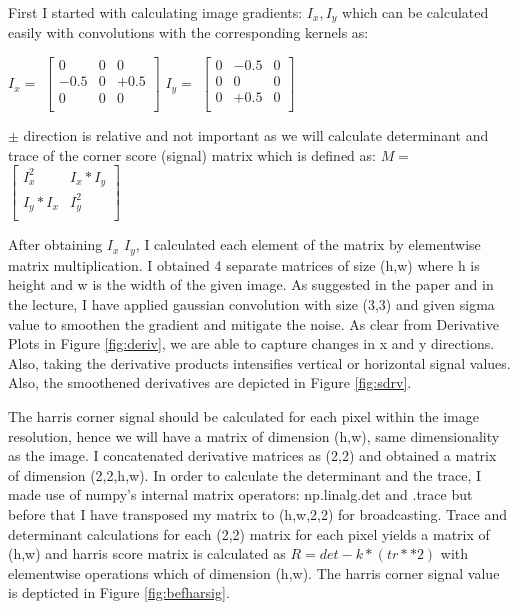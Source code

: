 \documentclass{article}
\begin{document}
\begin{center}
    \raggedright
    First I started with calculating image gradients: $I_x, I_y$ which can be calculated easily with convolutions with the corresponding kernels as: \\
    \vspace{0.5cm}

    $I_x = $ 
    $\begin{bmatrix}
        0 & 0 & 0  \\
        -0.5 & 0 & +0.5  \\
        0 & 0 & 0  \\
    \end{bmatrix}$ \quad
    $I_y = $ 
    $\begin{bmatrix}
        0 & -0.5 & 0  \\
        0 & 0 & 0  \\
        0 & +0.5 & 0  \\
    \end{bmatrix}$
    
    $\pm $ direction is relative and not important as we will calculate determinant and trace of the corner score (signal) matrix which is defined as:
    $M = $
    $\begin{bmatrix}
        I_x^{2} & I_{x}*I_{y} \\
        I_{y}*I_{x} & I_y^{2} \\
    \end{bmatrix}$

    \begin{center}
        \raggedright
        After obtaining $I_x$ $I_y$, I calculated each element of the matrix by elementwise matrix multiplication. I obtained 4 separate matrices of size (h,w) where h is height and w is the width of the given image. As suggested in the paper and in the lecture, I have applied gaussian convolution with size (3,3) and given sigma value to smoothen the gradient and mitigate the noise. As clear from Derivative Plots in Figure \ref{fig:deriv}, we are able to capture changes in x and y directions. Also, taking the derivative products intensifies vertical or horizontal signal values. Also, the smoothened derivatives are depicted in Figure \ref{fig:sdrv}.
        
        The harris corner signal should be calculated for each pixel within the image resolution, hence we will have a matrix of dimension (h,w), same dimensionality as the image. I concatenated derivative matrices as (2,2) and obtained a matrix of dimension (2,2,h,w). In order to calculate the determinant and the trace, I made use of numpy's internal matrix operators: np.linalg.det and .trace but before that I have transposed my matrix to (h,w,2,2) for broadcasting. Trace and determinant calculations for each (2,2) matrix for each pixel yields a matrix of (h,w) and harris score matrix is calculated as $R = det - k*(tr**2)$ with elementwise operations which of dimension (h,w). The harris corner signal value is depticted in Figure \ref{fig:befharsig}.


\end{center}
\end{center}
\end{document}
